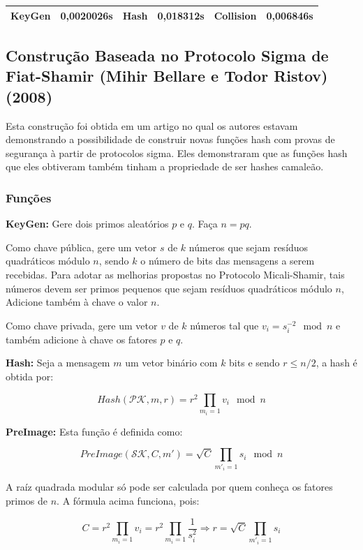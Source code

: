 \documentclass[a4paper]{article}
\begin{document}
\begin{center}
\begin{tabular}{|c|c|c|c|c|c|}
  \hline
  KeyGen & 0,0020026s & Hash & 0,018312s & Collision & 0,006846s\\
  \hline
\end{tabular}
\end{center}


\subsection{Construção Baseada no Protocolo Sigma de Fiat-Shamir
  (Mihir Bellare e Todor Ristov) (2008)\cite{sigma}}

Esta construção foi obtida em um artigo no qual os autores estavam
demonstrando a possibilidade de construir novas funções hash com
provas de segurança à partir de protocolos sigma. Eles demonstraram
que as funções hash que eles obtiveram também tinham a propriedade de
ser hashes camaleão.

\subsubsection{Funções}

\textbf{KeyGen: } Gere dois primos aleatórios $p$ e $q$. Faça $n=pq$.

Como chave pública, gere um vetor $s$ de $k$ números que sejam
resíduos quadráticos módulo $n$, sendo $k$ o número de bits das
mensagens a serem recebidas. Para adotar as melhorias propostas no
Protocolo Micali-Shamir, tais números devem ser primos pequenos que
sejam resíduos quadráticos módulo $n$, Adicione também à chave o valor
$n$.

Como chave privada, gere um vetor $v$ de $k$ números tal que
$v_i=s_i^{-2} \mod n$ e também adicione à chave os fatores $p$ e $q$.

\textbf{Hash: } Seja a mensagem $m$ um vetor binário com $k$ bits e
sendo $r \leq n/2$, a hash é obtida por:

$$ Hash(\mathcal{PK}, m, r) = r^2\prod_{m_i=1}v_i \mod n
$$

\textbf{PreImage: } Esta função é definida como:

$$
PreImage(\mathcal{SK}, C, m') = \sqrt{C}\prod_{m'_i=1}s_i \mod n
$$

A raíz quadrada modular só pode ser calculada por quem conheça os
fatores primos de $n$. A fórmula acima funciona, pois:

$$ C = r^2\prod_{m_i=1}v_i =
r^2\prod_{m_i=1}\frac{1}{s_i^2}\Longrightarrow r=\sqrt{C}\prod_{m'_i=1}s_i
$$
\end{document}
